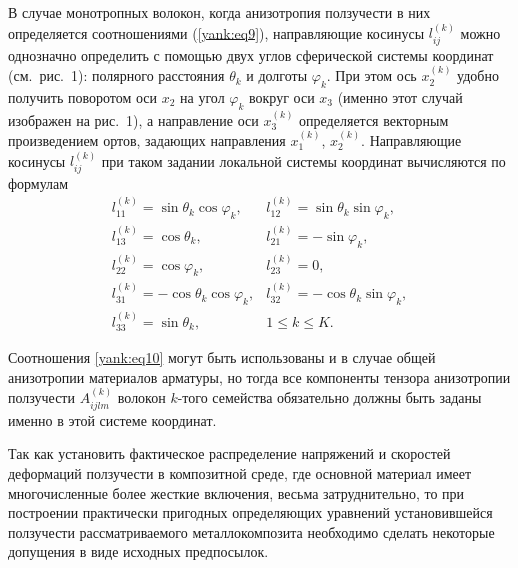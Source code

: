 В случае монотропных волокон, когда анизотропия ползучести в них определяется соотношениями (\ref{yank:eq9}), направляющие косинусы $l_{ij}^{(k)}$ можно однозначно определить с помощью двух углов сферической системы координат (см.~рис.~1): полярного расстояния $\theta _k $ и долготы $\varphi _k$. 
При этом ось $x_2^{(k)}$ удобно получить поворотом оси $x_2$ на угол $\varphi _k$ вокруг оси $x_3$ (именно этот случай изображен на рис.~1), а направление оси $x_3^{(k)}$ определяется векторным произведением ортов, задающих направления $x_1^{(k)}$, $x_2^{(k)}$. Направляющие косинусы $l_{ij}^{(k)}$ при таком задании локальной системы координат вычисляются по
формулам
\begin{equation}
\label{yank:eq10}
\begin{array}{ll}
l_{11}^{(k)} =\sin \theta _k \cos \varphi _k , &
l_{12}^{(k)} =\sin \theta _k \sin \varphi _k ,\\
l_{13}^{(k)} =\cos \theta _k , & 
l_{21}^{(k)} =-\sin \varphi _k ,\\
l_{22}^{(k)} =\cos \varphi _k, &
l_{23}^{(k)} =0,\\
l_{31}^{(k)} =-\cos \theta _k \cos \varphi _k, &
l_{32}^{(k)} =-\cos \theta _k \sin \varphi _k ,\\
l_{33}^{(k)} =\sin \theta _k ,  & 1\le k\le K.
\end{array}
\end{equation}

Соотношения \eqref{yank:eq10} могут быть использованы и в случае общей анизотропии
материалов арматуры, но тогда все компоненты тензора анизотропии ползучести
$A_{ijlm}^{(k)}$ волокон $k$-того семейства обязательно должны быть заданы именно в этой системе координат.

Так как установить фактическое распределение напряжений и скоростей
деформаций ползучести в композитной среде, где основной материал имеет
многочисленные более жесткие включения, весьма затруднительно, то при
построении практически пригодных определяющих уравнений установившейся
ползучести рассматриваемого металлокомпозита необходимо сделать некоторые
допущения в виде исходных предпосылок.

